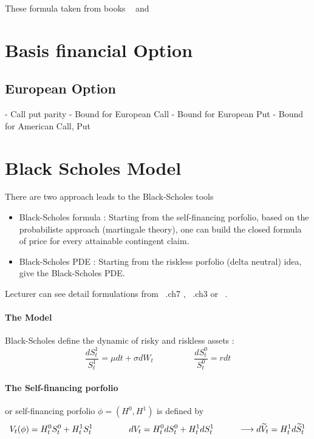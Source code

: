 \documentclass[a4paper,10pt]{article}
\begin{document}
\begin{center}\end{center}
These formula taken from books ~\cite{mathfiElliot} and ~\cite{mathfiMarek} 
\section{Basis financial Option}
\subsection{European Option}
- Call put parity
- Bound for European Call
- Bound for European Put
- Bound for American Call, Put
\section{Black Scholes Model}
There are two approach leads to the Black-Scholes tools
\begin{itemize}
 \item Black-Scholes formula : Starting from the self-financing porfolio, based on the probabiliste approach (martingale theory), one can build the closed formula of price for every attainable contingent claim. 
 \item Black-Scholes PDE : Starting from the riskless porfolio (delta neutral) idea, give the Black-Scholes PDE.
\end{itemize}
Lecturer can see detail formulations from ~\cite{mathfiElliot}.ch7 , ~\cite{mathfiMarek}.ch3 or ~\cite{rouah}.  
\paragraph{The Model} Black-Scholes define the dynamic of risky and riskless assets :
\[
\frac{dS^1_t}{S^1_t} = \mu dt + \sigma d W_t   \hspace{2cm} \frac{dS^0_t}{S^0_t} = r dt
\]
\paragraph{The Self-financing porfolio} or self-financing porfolio $\phi = (H^0,H^1)$ is defined by
\[
V_t(\phi) = H^0_t S^0_t + H^1_t S^1_t   
\hspace{1.5cm} 
dV_t = H^0_t dS^0_t + H^1_t dS^1_t 
\hspace{1cm} \longrightarrow
d\widetilde{V}_t = H^1_t d\widetilde{S}^1_t 
\]
\end{document}
